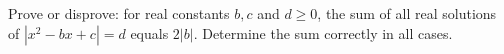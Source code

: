 Prove or disprove: for real constants $b,c$ and $d\ge0$, the sum of all real solutions of $\left|x^2-bx+c\right|=d$ equals $2|b|$. Determine the sum correctly in all cases.
